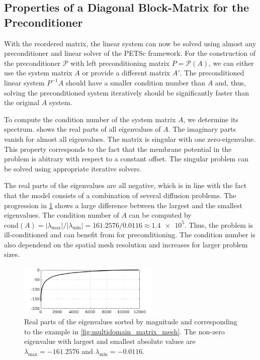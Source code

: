 \subsection{Properties of a Diagonal Block-Matrix for the Preconditioner}\label{sec:multidomain_diagonal_matrix}
With the reordered matrix, the linear system can now be solved using almost any preconditioner and linear solver of the PETSc framework. 
For the construction of the preconditioner $\mathcal{P}$ with left preconditioning matrix $P=\mathcal{P}(A)$, we can either use the system matrix $A$ or provide a different matrix $A'$. The preconditioned linear system $P^{-1}A$ should have a smaller condition number than $A$ and, thus, solving the preconditioned system iteratively should be significantly faster than the original $A$ system.

To compute the condition number of the system matrix $A$, we determine its spectrum.  shows the real parts of all eigenvalues of $A$. The imaginary parts vanish for almost all eigenvalues. The matrix is singular with one zero-eigenvalue. This property corresponds to the fact that the membrane potential in the problem is abitrary with respect to a constant offset. The singular problem can be solved using appropriate iterative solvers.

The real parts of the eigenvalues are all negative, which is in line with the fact that the model consists of a combination of several diffusion problems. The progression in \cref{fig:eigenvalues} shows a large difference between the largest and the smallest eigenvalues. The condition number of $A$ can be computed by $\textrm{cond}(A) = |\lambda_\text{max}| / |\lambda_\text{min}| = 161.2576 / 0.0116 \approx \num{1.4e5}$. Thus, the problem is ill-conditioned and can benefit from for preconditioning. The condition number is also dependend on the spatial mesh resolution and increases for larger problem sizes.

\begin{figure}
  \centering%
  \includegraphics[width=0.6\textwidth]{images/implementation/eigenvalues.png}%
  \caption{Real parts of the eigenvalues sorted by magnitude and corresponding to the example in \cref{fig:multidomain_matrix_mesh}. The non-zero eigenvalue with largest and smallest absolute values are $\lambda_\text{max} = \num{-161.2576}$ and $\lambda_\text{min} = \num{-0.0116}$.}%
  \label{fig:eigenvalues}%
\end{figure}%


